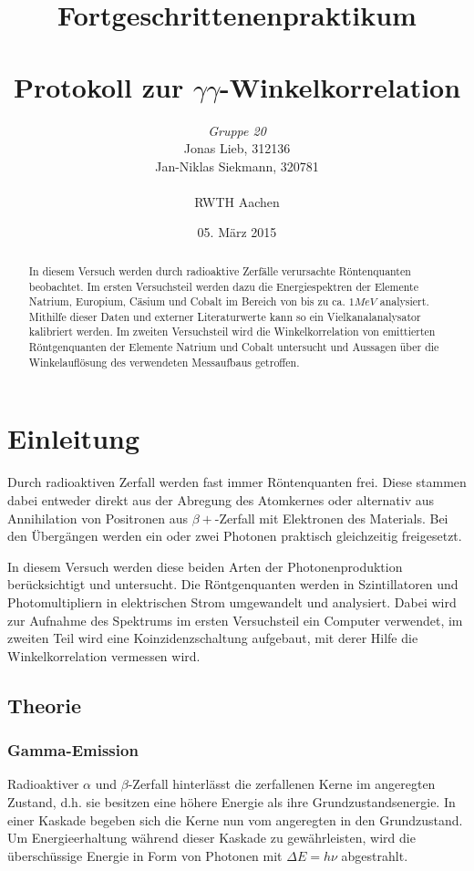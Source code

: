 \documentclass{../Misc/MontavonLaTeX/Montavon}
\date{05. März 2015}
\begin{document}
\title{Fortgeschrittenenpraktikum \\ \quad \\ Protokoll zur $\gamma\gamma$-Winkelkorrelation }
\author{\emph{Gruppe 20} \\  Jonas Lieb, 312136 \\ Jan-Niklas Siekmann, 320781 \\ \ \\  RWTH Aachen}
\maketitle
\begin{abstract}
In diesem Versuch werden durch radioaktive Zerfälle verursachte Röntenquanten beobachtet. Im ersten Versuchsteil werden dazu die Energiespektren der Elemente Natrium, Europium, Cäsium und Cobalt im Bereich von bis zu ca. $1 \unit{MeV}$ analysiert. Mithilfe dieser Daten und externer Literaturwerte kann so ein Vielkanalanalysator kalibriert werden.
Im zweiten Versuchsteil wird die Winkelkorrelation von emittierten Röntgenquanten der Elemente Natrium und Cobalt untersucht und Aussagen über die Winkelauflösung des verwendeten Messaufbaus getroffen.
\end{abstract}
\newpage

\tableofcontents
\newpage

\section{Einleitung}

Durch radioaktiven Zerfall werden fast immer Röntenquanten frei. Diese stammen dabei entweder direkt aus der Abregung des Atomkernes oder alternativ aus Annihilation von Positronen aus $\beta+$-Zerfall mit Elektronen des Materials. Bei den Übergängen werden ein oder zwei Photonen praktisch gleichzeitig freigesetzt. 

In diesem Versuch werden diese beiden Arten der Photonenproduktion berücksichtigt und untersucht.
Die Röntgenquanten werden in Szintillatoren und Photomultipliern in elektrischen Strom umgewandelt und analysiert. Dabei wird zur Aufnahme des Spektrums im ersten Versuchsteil ein Computer verwendet, im zweiten Teil wird eine Koinzidenzschaltung aufgebaut, mit derer Hilfe die Winkelkorrelation vermessen wird.

\subsection{Theorie}
\subsubsection{Gamma-Emission}
Radioaktiver $\alpha$ und $\beta$-Zerfall hinterlässt die zerfallenen Kerne im angeregten Zustand, d.h. sie besitzen eine höhere Energie als ihre Grundzustandsenergie. In einer Kaskade begeben sich die Kerne nun vom angeregten in den Grundzustand. Um Energieerhaltung während dieser Kaskade zu gewährleisten, wird die überschüssige Energie in Form von Photonen mit $\Delta E = h \nu$ abgestrahlt.
\end{document}
